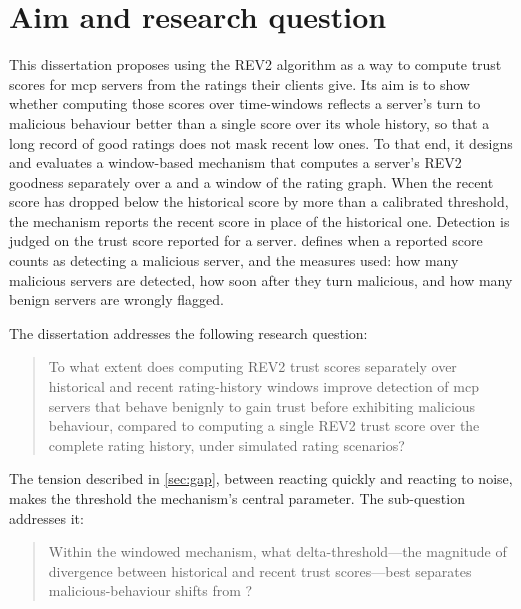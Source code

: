 \section{Aim and research question}\label{sec:aim}

This dissertation proposes using the REV2 algorithm as a way to compute trust scores for \gls{mcp} servers from the ratings their clients give. Its aim is to show whether computing those scores over \glspl{time-window} reflects a server's turn to malicious behaviour better than a single score over its whole history, so that a long record of good ratings does not mask recent low ones. To that end, it designs and evaluates a window-based mechanism that computes a server's REV2 goodness separately over a  and a  window of the rating graph. When the recent score has dropped below the historical score by more than a calibrated threshold, the mechanism reports the recent score in place of the historical one. Detection is judged on the trust score reported for a server.  defines when a reported score counts as detecting a malicious server, and the measures used: how many malicious servers are detected, how soon after they turn malicious, and how many benign servers are wrongly flagged.

The dissertation addresses the following research question:

\begin{quote}
    To what extent does computing REV2 trust scores separately over historical and recent rating-history windows improve detection of \gls{mcp} servers that behave benignly to gain trust before exhibiting malicious behaviour, compared to computing a single REV2 trust score over the complete rating history, under simulated rating scenarios?
\end{quote}

The tension described in \cref{sec:gap}, between reacting quickly and reacting to noise, makes the threshold the mechanism's central parameter. The sub-question addresses it:

\begin{quote}
    Within the windowed mechanism, what \gls{delta-threshold}---the magnitude of divergence between historical and recent trust scores---best separates malicious-behaviour shifts from ?
\end{quote}


